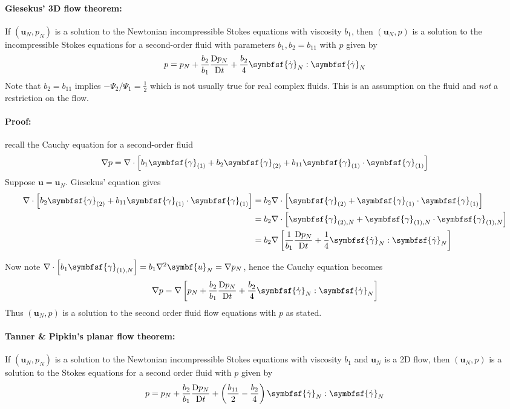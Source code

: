 \documentclass{jknotes}
\newcommand{\nsrate}[1]{\symbfsf{\gamma}_{(#1)}}
\newcommand{\Nsrate}[1]{\symbfsf{\gamma}_{(#1),N}}
\begin{document}
\paragraph{Giesekus' 3D flow theorem:}
If $(\symbf{u}_N, p_N)$ is a solution to the Newtonian incompressible Stokes
equations with viscosity $b_1$, then $(\symbf{u}_N, p)$ is a solution to the
incompressible Stokes equations for a second-order fluid with parameters $b_1,
b_2 = b_{11}$ with $p$ given by
\begin{equation}
	p = p_N + \frac{b_2}{b_1} \frac{\diffD p_N}{\diffD t} + \frac{b_2}{4}
	\symbfsf{\srate}_N : \symbfsf{\srate}_N
\end{equation}
Note that $b_2 = b_{11}$ implies $-\Psi_2/\Psi_1 = \frac{1}{2}$ which is not
usually true for real complex fluids. This is an assumption on the fluid and
\emph{not} a restriction on the flow.

\paragraph{Proof:} recall the Cauchy equation for a second-order fluid
\begin{equation}
	\nabla p = \nabla \cdot \left[ b_1 \nsrate{1} + b_2 \nsrate{2} + b_{11}
	\nsrate{1}\cdot\nsrate{1}\right]
\end{equation}
Suppose $\symbf{u} = \symbf{u}_N$. Giesekus' equation gives
\begin{align}
	\nabla \cdot \left[b_2 \nsrate{2} + b_{11}
		\nsrate{1}\cdot\nsrate{1}\right] &= b_2 \nabla \cdot \left[ \nsrate{2}
	+ \nsrate{1} \cdot \nsrate{1}\right] \\
	&= b_2 \nabla \cdot \left[ \Nsrate{2} + \Nsrate{1}\cdot\Nsrate{1}\right]
	\\
	&= b_2 \nabla \left[ \inv{b_1} \frac{\diffD p_N}{\diffD t} + \frac{1}{4}
\symbfsf{\srate}_N :\symbfsf{\srate}_N \right]
\end{align}

Now note $\nabla \cdot\left[ b_1 \Nsrate{1}\right] = b_1 \nabla^2 \symbf{u}_N
= \nabla p_N$, hence the Cauchy equation becomes
\begin{equation}
	\nabla p = \nabla \left[ p_N + \frac{b_2}{b_1} \frac{\diffD p_N}{\diffD t}
	+ \frac{b_2}{4} \symbfsf{\srate}_N : \symbfsf{\srate}_N \right]
\end{equation}
Thus $(\symbf{u}_N, p)$ is a solution to the second order fluid flow equations
with $p$ as stated. \qedsymbol

\paragraph{Tanner \& Pipkin's planar flow theorem:} If $(\symbf{u}_N, p_N)$ is
a solution to the Newtonian incompressible Stokes equations with viscosity
$b_1$ and $\symbf{u}_N$ is a 2D flow, then $(\symbf{u}_N, p)$ is a solution to the Stokes
equations for a second order fluid with $p$ given by
\begin{equation}
	p = p_N + \frac{b_2}{b_1} \frac{\diffD p_N}{\diffD t} +
	\left(\frac{b_{11}}{2} - \frac{b_2}{4}\right) \symbfsf{\srate}_N : 
	\symbfsf{\srate}_N
\end{equation}
\end{document}
